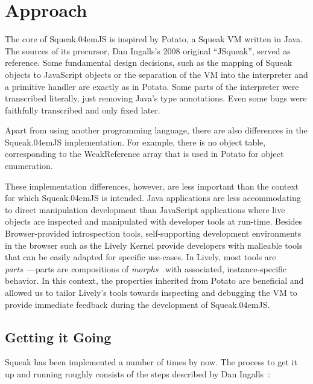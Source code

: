 \documentclass[natbib]{sigplanconf}
\newcommand*\SqueakJS{Squeak\texorpdfstring{\kern.04em}{}JS\xspace}
\newcommand*\JS{JavaScript\xspace}
\begin{document}

\section{Approach}
\label{sec:approach}

The core of \SqueakJS is inspired by Potato, a Squeak \ac{VM} written
in Java. The sources of its precursor, Dan Ingalls's 2008 original ``JSqueak'',
served as reference. Some fundamental design decisions, such as the mapping of Squeak
objects to \JS objects or the separation of the VM into the interpreter
and a primitive handler are exactly as in Potato. Some parts of the
interpreter were transcribed literally, just removing Java's type
annotations. Even some bugs were faithfully transcribed and only fixed later.

Apart from using another programming language, there are also differences in the
\SqueakJS implementation. For example, there is no object table,
corresponding to the WeakReference array that is used in Potato for
object enumeration.

These implementation differences, however, are less important than the
context for which \SqueakJS is intended. Java applications are less
accommodating to direct manipulation development than \JS applications
where live objects are inspected and manipulated with developer tools
at run-time. Besides Browser-provided introspection tools,
self-supporting development environments in the browser such as the
Lively Kernel provide developers with malleable tools that can be
easily adapted for specific use-cases. In Lively, most tools are
\emph{parts}~\cite{lincke2012lively}---parts are compositions of
\emph{morphs}~\cite{maloney1995morphic} with associated,
instance-specific behavior. In this context, the properties inherited
from Potato are beneficial and allowed us to tailor Lively's tools
towards inspecting and debugging the \ac{VM} to provide immediate
feedback during the development of \SqueakJS.

\subsection{Getting it Going}
\label{sec:getting-it-going}

Squeak has been implemented a number of times by now. The
process to get it up and running roughly consists of the steps
described by Dan Ingalls~\cite{IngallsKaehlerMaloneyWallaceKay97}:
\end{document}
